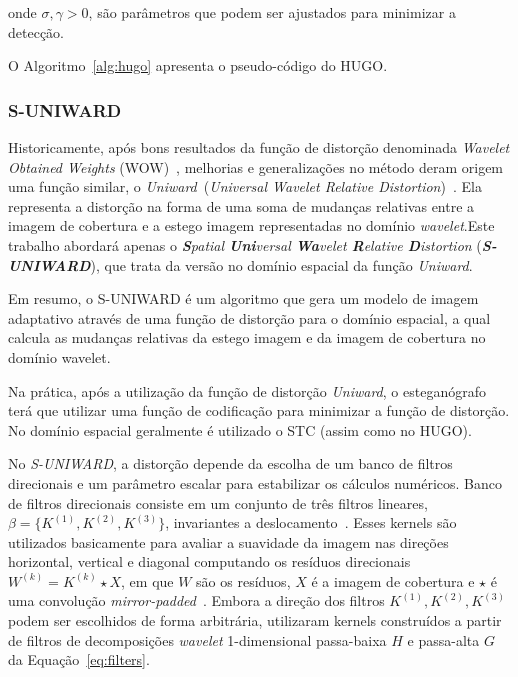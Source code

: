 \noindent onde $\sigma, \gamma > 0$, são parâmetros que podem ser ajustados para minimizar a detecção.

O Algoritmo~\ref{alg:hugo} apresenta o pseudo-código do HUGO.



\subsubsection{S-UNIWARD}
\label{subsec:S-UNIWARD}


Historicamente, após bons resultados da função de distorção denominada \textit{Wavelet Obtained Weights} (WOW)~\cite{holub2012designing}, melhorias e generalizações no método deram origem uma função similar, o \textit{Uniward}~(\textit{Universal Wavelet Relative Distortion})~\cite{holub2014universal}. Ela representa a distorção na forma de uma soma de mudanças relativas entre a imagem de cobertura e a estego imagem representadas no domínio \textit{wavelet}.Este trabalho abordará apenas o \textit{\textbf{S}patial \textbf{Uni}versal \textbf{Wa}velet \textbf{R}elative \textbf{D}istortion} (\textbf{\textit{S-UNIWARD}}), que trata da versão no domínio espacial da função \textit{Uniward}.

Em resumo, o S-UNIWARD é um algoritmo que gera um modelo de imagem adaptativo através de uma função de distorção para o domínio espacial, a qual calcula as mudanças relativas da estego imagem e da imagem de cobertura no domínio wavelet.

Na prática, após a utilização da função de distorção \textit{Uniward}, o esteganógrafo terá que utilizar uma função de codificação para minimizar a função de distorção. No domínio espacial geralmente é utilizado o STC (assim como no HUGO).

No \textit{S-UNIWARD}, a distorção depende da escolha de um banco de filtros direcionais e um parâmetro escalar para estabilizar os cálculos numéricos. Banco de filtros direcionais consiste em um conjunto de três filtros lineares, $\beta = \{K^{(1)}, K^{(2)},K^{(3)}\}$, invariantes a deslocamento~\cite{holub2014universal}. Esses kernels são utilizados basicamente para avaliar a suavidade da imagem nas direções horizontal, vertical e diagonal computando os resíduos direcionais $W^{(k)} = K^{(k)} \star X$, em que $W$ são os resíduos, $X$ é a imagem de cobertura e $\star$ é uma convolução \textit{mirror-padded}~\cite{holub2012designing}. Embora a direção dos filtros $K^{(1)}, K^{(2)},K^{(3)}$ podem ser escolhidos de forma arbitrária,  utilizaram kernels construídos a partir de filtros de decomposições \textit{wavelet} 1-dimensional passa-baixa $H$ e passa-alta $G$ da Equação~\ref{eq:filters}.

